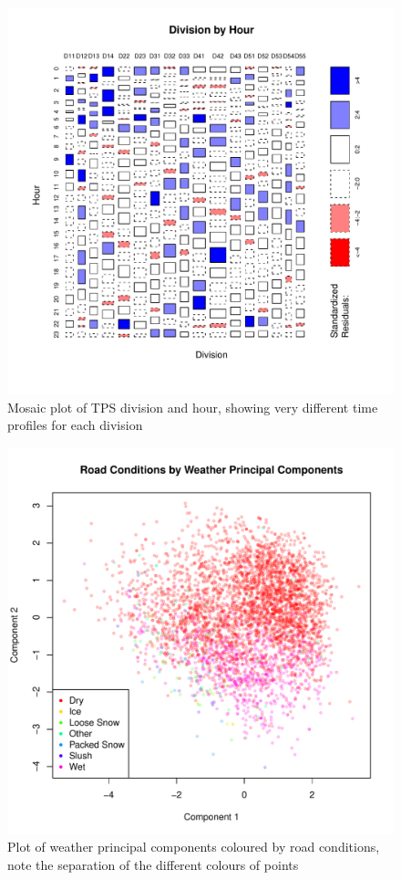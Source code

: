 \documentclass{article}
\begin{document}
\begin{figure}[!h]
	\begin{center}
		\includegraphics[scale = 1]{divisionhour}
		\caption{Mosaic plot of TPS division and hour, showing very different time profiles for each division}
		\label{fig:divisionhour}
	\end{center}
\end{figure}

\begin{figure}[!h]
	\begin{center}
		\includegraphics[scale = 1]{roadcondweather}
		\caption{Plot of weather principal components coloured by road conditions, note the separation of the different colours of points}
		\label{fig:roadcondweather}
	\end{center}
\end{figure}
\end{document}
